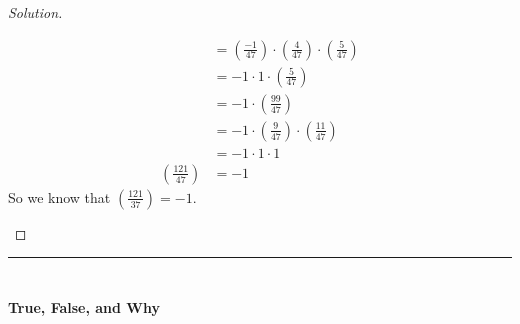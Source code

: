 \documentclass[11pt]{article}
\newcommand\leg[2]{\left(\frac{#1}{#2}\right)}
\newenvironment{solution}
  {\renewcommand\qedsymbol{$~$}\begin{proof}[Solution]$ $\par\nobreak\ignorespaces}
  {\end{proof}}
\begin{document}
\begin{solution}
\begin{itemize}
\begin{align*}
                          & = \leg{-1}{47} \cdot \leg{4}{47} \cdot \leg{5}{47} \\
                          & = -1 \cdot 1 \cdot \leg{5}{47}                     \\
                          & = -1 \cdot \leg{99}{47}                            \\
                          & = -1 \cdot \leg{9}{47} \cdot \leg{11}{47}          \\
                          & = -1 \cdot 1 \cdot 1                               \\
            \leg{121}{47} & = -1
          \end{align*}
          So we know that $\leg{121}{37}= -1$.
  \end{itemize}
\end{solution}


\hrule

\section{}

\textbf{True, False, and Why}
\end{document}
